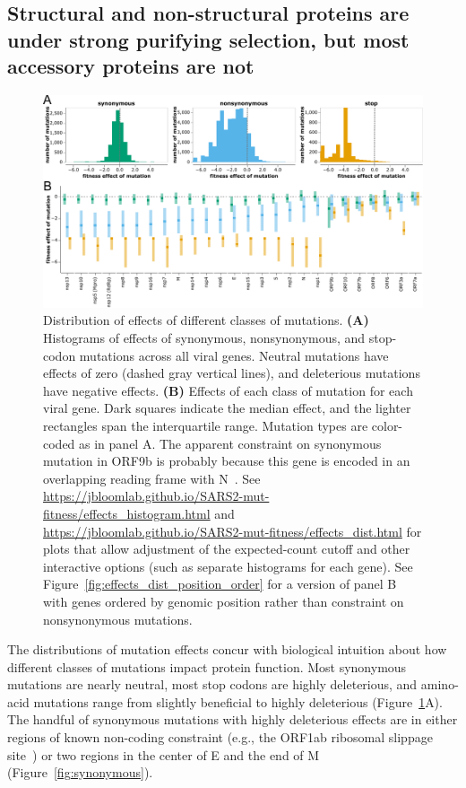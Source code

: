 \documentclass[9pt,twocolumn,twoside]{gsajnl_modified}
\begin{document}
\subsection*{Structural and non-structural proteins are under strong purifying selection, but most accessory proteins are not}

\begin{figure}
\includegraphics[width=\linewidth]{figs/dist.pdf}
\caption{
Distribution of effects of different classes of mutations.
{\bf (A)}
Histograms of effects of synonymous, nonsynonymous, and stop-codon mutations across all viral genes.
Neutral mutations have effects of zero (dashed gray vertical lines), and deleterious mutations have negative effects.
{\bf (B)}
Effects of each class of mutation for each viral gene.
Dark squares indicate the median effect, and the lighter rectangles span the interquartile range.
Mutation types are color-coded as in panel A.
The apparent constraint on synonymous mutation in ORF9b is probably because this gene is encoded in an overlapping reading frame with N~\cite{jungreis2021conflicting}.
See \url{https://jbloomlab.github.io/SARS2-mut-fitness/effects_histogram.html} and \url{https://jbloomlab.github.io/SARS2-mut-fitness/effects_dist.html} for plots that allow adjustment of the expected-count cutoff and other interactive options (such as separate histograms for each gene).
See Figure~\ref{fig:effects_dist_position_order} for a version of panel B with genes ordered by genomic position rather than constraint on nonsynonymous mutations.
\label{fig:dist}
}
\end{figure}

The distributions of mutation effects concur with biological intuition about how different classes of mutations impact protein function.
Most synonymous mutations are nearly neutral, most stop codons are highly deleterious, and amino-acid mutations range from slightly beneficial to highly deleterious (Figure~\ref{fig:dist}A).
The handful of synonymous mutations with highly deleterious effects are in either regions of known non-coding constraint (e.g., the ORF1ab ribosomal slippage site~\cite{bhatt2021structural}) or two regions in the center of E and the end of M (Figure~\ref{fig:synonymous}).
\end{document}
